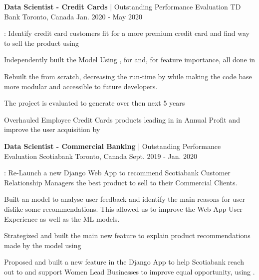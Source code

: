 \begin{cventries}
  \cventry
    {\textbf{Data Scientist - Credit Cards} | Outstanding Performance Evaluation} %
    {TD Bank} %
    {Toronto, Canada} %
    {Jan. 2020 - May 2020} %
    {
      \begin{cvitems} %
        \item {: Identify credit card customers fit for a more premium credit card and find way to sell the product using }
        \item {Independently built the  Model Using ,  for  and,  for feature importance, all done in }
        \item {Rebuilt the  from scratch, decreasing the run-time by  while making the code base more modular and accessible to future developers.}
        \item {The project is evaluated to generate  over then next 5 years}
        \item {Overhauled Employee Credit Cards products leading in  in Annual Profit and improve the user acquisition by }
      \end{cvitems}
    }

  \cventry
    {\textbf{Data Scientist - Commercial Banking} | Outstanding Performance Evaluation} %
    {Scotiabank} %
    {Toronto, Canada} %
    {Sept. 2019 - Jan. 2020} %
    {
      \begin{cvitems} %
        \item {: Re-Launch a new Django Web App to recommend Scotiabank Customer Relationship Managers the best product to sell to their Commercial Clients.}
        \item {Built an  model to analyse user feedback and identify the main reasons for user dislike some recommendations. This allowed us to improve the Web App User Experience as well as the ML models.}
        \item {Strategized and built the main new feature to explain product recommendations made by the  model using }
        \item {Proposed and built a new feature in the Django App to help Scotiabank reach out to and support Women Lead Businesses to improve equal opportunity, using .}
      \end{cvitems}
    }


\end{cventries}

